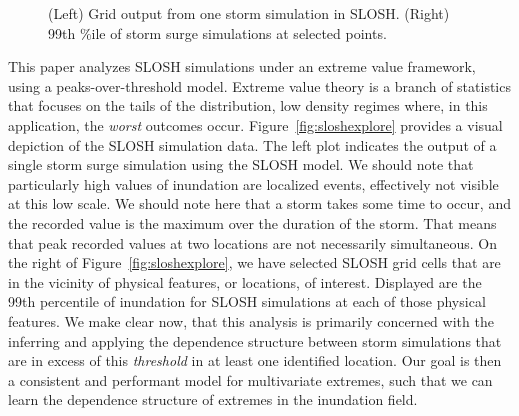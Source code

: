 \begin{figure}[ht]
\begin{minipage}{0.45\textwidth}
    \end{minipage}
    \caption{(Left) Grid output from one storm simulation in SLOSH.  (Right)  
        99th \%ile of storm surge simulations at selected points. 
        }
\end{figure}

This paper analyzes SLOSH simulations under an extreme value framework, using a
    peaks-over-threshold model.  Extreme value theory is a branch of statistics
    that focuses on the tails of the distribution, low density regimes where,
    in this application, the \emph{worst} outcomes occur.  
    Figure~\ref{fig:sloshexplore} provides a visual depiction of the SLOSH 
    simulation data.  The left plot indicates the output of a single storm surge 
    simulation using the SLOSH model.   We should note that particularly high
    values of inundation are localized events, effectively not visible at this
    low scale. We should note here that a storm takes some time to occur, and 
    the recorded value is the maximum over the duration of the storm.  That 
    means that peak recorded values at two locations are not necessarily 
    simultaneous.
    On the right of Figure~\ref{fig:sloshexplore}, we have selected SLOSH grid 
    cells that are in the vicinity of physical features, or locations, of 
    interest.  Displayed are the 99th percentile 
    of inundation for SLOSH simulations at each of those physical features.
    We make clear now, that this analysis is primarily concerned with the
    inferring and applying the dependence structure between storm simulations
    that are in excess of this \emph{threshold} in at least one identified location.
    Our goal is then a consistent and performant model for multivariate extremes, 
    such that we can learn the dependence structure of extremes in the inundation field.
    


